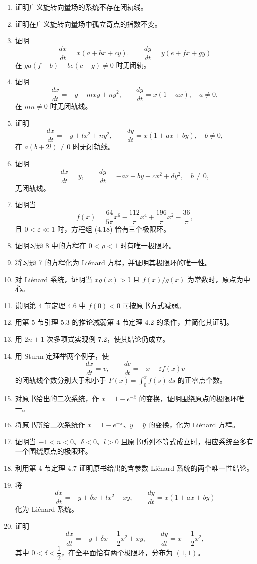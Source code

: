 \begin{enumerate}
\item 证明广义旋转向量场的系统不存在闭轨线。
\item 证明在广义旋转向量场中孤立奇点的指数不变。
\item 证明
\[
\dfrac{dx}{dt}=x(a+bx+cy),\qquad \dfrac{dy}{dt}=y(e+fx+gy)
\]
在 $ga(f-b)+be(c-g)\ne0$ 时无闭轨。
\item 证明
\[
\dfrac{dx}{dt}=-y+mxy+ny^2,\qquad \dfrac{dy}{dt}=x(1+ax),\quad a\ne0,
\]
在 $mn\ne0$ 时无闭轨线。
\item 证明
\[
\dfrac{dx}{dt}=-y+lx^2+ny^2,\qquad \dfrac{dy}{dt}=x(1+ax+by),\quad b\ne0,
\]
在 $a(b+2l)\ne0$ 时无闭轨线。
\item 证明
\[
\dfrac{dx}{dt}=y,\qquad \dfrac{dy}{dt}=-ax-by+cx^2+dy^2,\quad b\ne0,
\]
无闭轨线。
\item 证明当
\[
f(x)=\dfrac{64}{5\pi}x^6-\dfrac{112}{\pi}x^4+\dfrac{196}{\pi}x^2-\dfrac{36}{\pi},
\]
且 $0<\varepsilon\ll1$ 时，方程组 (4.18) 恰有三个极限环。
\item 证明习题 8 中的方程在 $0<\rho<1$ 时有唯一极限环。
\item 将习题 7 的方程化为 Liénard 方程，并证明其极限环的唯一性。
\item 对 Liénard 系统，证明当 $xg(x)>0$ 且 $f(x)/g(x)$ 为常数时，原点为中心。
\item 说明第 4 节定理 4.6 中 $f(0)<0$ 可按原书方式减弱。
\item 用第 5 节引理 5.3 的推论减弱第 4 节定理 4.2 的条件，并简化其证明。
\item 用 $2n+1$ 次多项式实现例 7.2，使其结论仍成立。
\item 用 Sturm 定理举两个例子，使
\[
\dfrac{dx}{dt}=v,\qquad\dfrac{dv}{dt}=-x-\varepsilon f(x)v
\]
的闭轨线个数分别大于和小于 $F(x)=\int_0^x f(s)\,ds$ 的正零点个数。
\item 对原书给出的二次系统，作 $x=1-e^{-\bar x}$ 的变换，证明围绕原点的极限环唯一。
\item 将原书所给二次系统作 $x=1-e^{-\bar x}$、$y=\bar y$ 的变换，化为 Liénard 方程。
\item 证明当 $-1<n<0$、$\delta<0$、$l>0$ 且原书所列不等式成立时，相应系统至多有一个围绕原点的极限环。
\item 利用第 4 节定理 4.7 证明原书给出的含参数 Liénard 系统的两个唯一性结论。
\item 将
\[
\dfrac{dx}{dt}=-y+\delta x+lx^2-xy,\qquad \dfrac{dy}{dt}=x(1+ax+by)
\]
化为 Liénard 系统。
\item 证明
\[
\dfrac{dx}{dt}=-y+\delta x-\dfrac12x^2+xy,\qquad
\dfrac{dy}{dt}=x-\dfrac12x^2,
\]
其中 $0<\delta<\dfrac12$，在全平面恰有两个极限环，分布为 $(1,1)$。
\end{enumerate}

